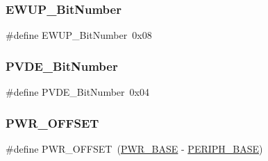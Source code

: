 \subsubsection{\texorpdfstring{EWUP\_BitNumber}{EWUP\_BitNumber}}
{\footnotesize\ttfamily \#define E\+W\+U\+P\+\_\+\+Bit\+Number~0x08}

\mbox{\label{group___p_w_r___private___defines_ga17d618eb800c401ef9c6789c9374eaf8}} 
\subsubsection{\texorpdfstring{PVDE\_BitNumber}{PVDE\_BitNumber}}
{\footnotesize\ttfamily \#define P\+V\+D\+E\+\_\+\+Bit\+Number~0x04}

\mbox{\label{group___p_w_r___private___defines_ga7f88bce73931300319824f22578f90de}} 
\subsubsection{\texorpdfstring{PWR\_OFFSET}{PWR\_OFFSET}}
{\footnotesize\ttfamily \#define P\+W\+R\+\_\+\+O\+F\+F\+S\+ET~(\mbox{\hyperlink{group___peripheral__memory__map_gac691ec23dace8b7a649a25acb110217a}{P\+W\+R\+\_\+\+B\+A\+SE}} -\/ \mbox{\hyperlink{group___peripheral__memory__map_ga9171f49478fa86d932f89e78e73b88b0}{P\+E\+R\+I\+P\+H\+\_\+\+B\+A\+SE}})}

